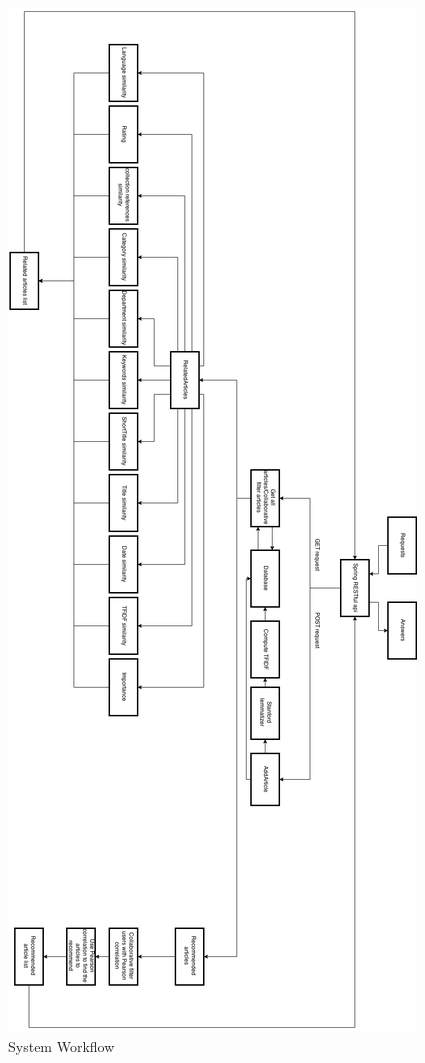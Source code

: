 \begin{figure}
\caption{System Workflow}
\includegraphics[width=\textwidth,height=\textheight,keepaspectratio]{src/img/workflow.png}
\end{figure}


